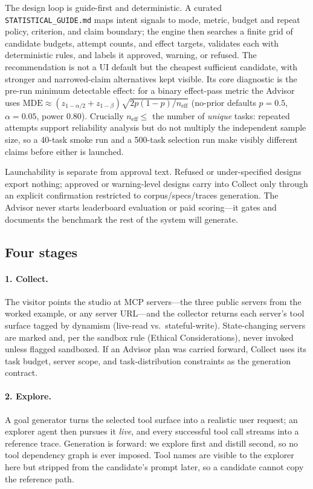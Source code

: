 The design loop is guide-first and deterministic. A curated
\texttt{STATISTICAL\_GUIDE.md} maps intent signals to mode, metric, budget and
repeat policy, criterion, and claim boundary; the engine then searches a finite
grid of candidate budgets, attempt counts, and effect targets, validates each
with deterministic rules, and labels it \textsf{approved}, \textsf{warning}, or
\textsf{refused}. The recommendation is not a UI default but the cheapest
sufficient candidate, with stronger and narrowed-claim alternatives kept
visible. Its core diagnostic is the pre-run minimum detectable effect: for a
binary effect-pass metric the Advisor uses
$\mathrm{MDE} \approx (z_{1-\alpha/2} + z_{1-\beta})\sqrt{2p(1-p)/n_{\mathrm{eff}}}$
(no-prior defaults $p=0.5$, $\alpha=0.05$, power $0.80$). Crucially
$n_{\mathrm{eff}} \leq$ the number of \emph{unique} tasks: repeated attempts
support reliability analysis but do not multiply the independent sample size, so
a 40-task smoke run and a 500-task selection run make visibly different claims
before either is launched.

Launchability is separate from approval text. Refused or under-specified designs
export nothing; approved or warning-level designs carry into Collect only through
an explicit confirmation restricted to corpus/specs/traces generation. The
Advisor never starts leaderboard evaluation or paid scoring---it gates and
documents the benchmark the rest of the system will generate.

\subsection{Four stages}

\paragraph{1. Collect.} The visitor points the studio at MCP servers---the
three public servers from the worked example, or any server URL---and the
collector returns each server's tool surface tagged by dynamism (live-read
vs.\ stateful-write). State-changing servers are marked and, per the sandbox
rule (Ethical Considerations), never invoked unless flagged sandboxed. If an
Advisor plan was carried forward, Collect uses its task budget, server scope,
and task-distribution constraints as the generation contract.

\paragraph{2. Explore.} A goal generator turns the selected tool surface into a
realistic user request; an explorer agent then pursues it \emph{live}, and every
successful tool call streams into a reference trace. Generation is forward: we
explore first and distill second, so no tool dependency graph is ever imposed.
Tool names are visible to the explorer here but stripped from the candidate's
prompt later, so a candidate cannot copy the reference path.

